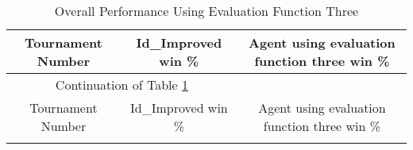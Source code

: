 \documentclass[11pt]{article}
\begin{document}
 \begin{longtable}[c]{| c | c |c |}
 \caption{Overall Performance Using Evaluation Function Three\label{eval_fun3_overall}}\\
 \hline
 \hline
 Tournament Number & Id\_Improved win \% & Agent using evaluation function three win \% \\
 \hline
 \endfirsthead
 
 \hline
 \multicolumn{2}{|c|}{Continuation of Table \ref{eval_fun3_overall}}\\ 
 \hline
 Tournament Number & Id\_Improved win \% & Agent using evaluation function three win \% \\
 \hline
 \endhead
 
 \hline
 \endfoot
 

\end{longtable}
\end{document}
